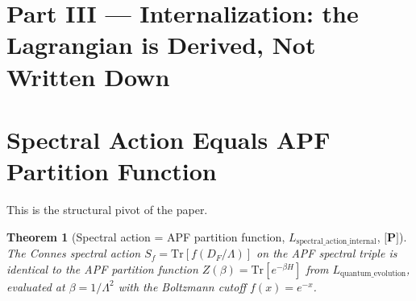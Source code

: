\documentclass[11pt]{article}
\newcommand{\epitag}[1]{\textbf{[#1]}}
\newtheorem{theorem}{Theorem}[section]
\theoremstyle{definition}
\begin{document}
\section*{Part III — Internalization: the Lagrangian is Derived, Not Written Down}

\section{Spectral Action Equals APF Partition Function}\label{sec:specaction}
This is the structural pivot of the paper.

\begin{theorem}[Spectral action = APF partition function, $L_{\mathrm{spectral\_action\_internal}}$, $\epitag{P}$]\label{thm:specaction}
The Connes spectral action $S_f = \mathrm{Tr}[f(D_F/\Lambda)]$ on the APF spectral triple is identical to the APF partition function $Z(\beta) = \mathrm{Tr}[e^{-\beta H}]$ from $L_{\mathrm{quantum\_evolution}}$, evaluated at $\beta = 1/\Lambda^2$ with the Boltzmann cutoff $f(x) = e^{-x}$.
\end{theorem}
\end{document}
